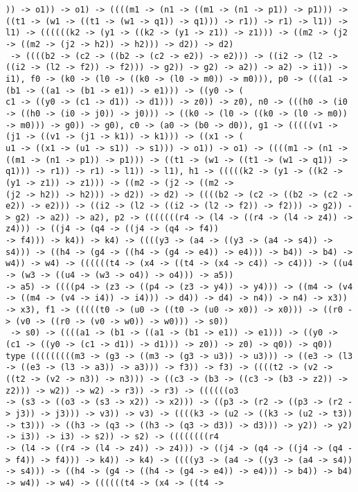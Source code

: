 \documentclass[11pt,oneside,a4paper]{report}
\begin{document}
\begin{lstlisting}[breaklines=true,caption={The output of an exponential type},label=lst:appedix:bigexp]
)) -> o1)) -> o1) -> ((((m1 -> (n1 -> ((m1 -> (n1 -> p1)) -> p1))) -> ((t1 -> (w1 -> ((t1 -> (w1 -> q1)) -> q1))) -> r1)) -> r1) -> l1)) -> l1) -> ((((((k2 -> (y1 -> ((k2 -> (y1 -> z1)) -> z1))) -> ((m2 -> (j2 -> ((m2 -> (j2 -> h2)) -> h2))) -> d2)) -> d2)
 -> ((((b2 -> (c2 -> ((b2 -> (c2 -> e2)) -> e2))) -> ((i2 -> (l2 -> ((i2 -> (l2 -> f2)) -> f2))) -> g2)) -> g2) -> a2)) -> a2) -> i1)) -> i1), f0 -> (k0 -> (l0 -> ((k0 -> (l0 -> m0)) -> m0))), p0 -> (((a1 -> (b1 -> ((a1 -> (b1 -> e1)) -> e1))) -> ((y0 -> (
c1 -> ((y0 -> (c1 -> d1)) -> d1))) -> z0)) -> z0), n0 -> (((h0 -> (i0 -> ((h0 -> (i0 -> j0)) -> j0))) -> ((k0 -> (l0 -> ((k0 -> (l0 -> m0)) -> m0))) -> g0)) -> g0), c0 -> (a0 -> (b0 -> d0)), g1 -> (((((v1 -> (j1 -> ((v1 -> (j1 -> k1)) -> k1))) -> ((x1 -> (
u1 -> ((x1 -> (u1 -> s1)) -> s1))) -> o1)) -> o1) -> ((((m1 -> (n1 -> ((m1 -> (n1 -> p1)) -> p1))) -> ((t1 -> (w1 -> ((t1 -> (w1 -> q1)) -> q1))) -> r1)) -> r1) -> l1)) -> l1), h1 -> (((((k2 -> (y1 -> ((k2 -> (y1 -> z1)) -> z1))) -> ((m2 -> (j2 -> ((m2 ->
(j2 -> h2)) -> h2))) -> d2)) -> d2) -> ((((b2 -> (c2 -> ((b2 -> (c2 -> e2)) -> e2))) -> ((i2 -> (l2 -> ((i2 -> (l2 -> f2)) -> f2))) -> g2)) -> g2) -> a2)) -> a2), p2 -> (((((((r4 -> (l4 -> ((r4 -> (l4 -> z4)) -> z4))) -> ((j4 -> (q4 -> ((j4 -> (q4 -> f4))
-> f4))) -> k4)) -> k4) -> ((((y3 -> (a4 -> ((y3 -> (a4 -> s4)) -> s4))) -> ((h4 -> (g4 -> ((h4 -> (g4 -> e4)) -> e4))) -> b4)) -> b4) -> w4)) -> w4) -> ((((((t4 -> (x4 -> ((t4 -> (x4 -> c4)) -> c4))) -> ((u4 -> (w3 -> ((u4 -> (w3 -> o4)) -> o4))) -> a5))
-> a5) -> ((((p4 -> (z3 -> ((p4 -> (z3 -> y4)) -> y4))) -> ((m4 -> (v4 -> ((m4 -> (v4 -> i4)) -> i4))) -> d4)) -> d4) -> n4)) -> n4) -> x3)) -> x3), f1 -> (((((t0 -> (u0 -> ((t0 -> (u0 -> x0)) -> x0))) -> ((r0 -> (v0 -> ((r0 -> (v0 -> w0)) -> w0))) -> s0))
 -> s0) -> ((((a1 -> (b1 -> ((a1 -> (b1 -> e1)) -> e1))) -> ((y0 -> (c1 -> ((y0 -> (c1 -> d1)) -> d1))) -> z0)) -> z0) -> q0)) -> q0))
type (((((((((m3 -> (g3 -> ((m3 -> (g3 -> u3)) -> u3))) -> ((e3 -> (l3 -> ((e3 -> (l3 -> a3)) -> a3))) -> f3)) -> f3) -> ((((t2 -> (v2 -> ((t2 -> (v2 -> n3)) -> n3))) -> ((c3 -> (b3 -> ((c3 -> (b3 -> z2)) -> z2))) -> w2)) -> w2) -> r3)) -> r3) -> ((((((o3
-> (s3 -> ((o3 -> (s3 -> x2)) -> x2))) -> ((p3 -> (r2 -> ((p3 -> (r2 -> j3)) -> j3))) -> v3)) -> v3) -> ((((k3 -> (u2 -> ((k3 -> (u2 -> t3)) -> t3))) -> ((h3 -> (q3 -> ((h3 -> (q3 -> d3)) -> d3))) -> y2)) -> y2) -> i3)) -> i3) -> s2)) -> s2) -> ((((((((r4
-> (l4 -> ((r4 -> (l4 -> z4)) -> z4))) -> ((j4 -> (q4 -> ((j4 -> (q4 -> f4)) -> f4))) -> k4)) -> k4) -> ((((y3 -> (a4 -> ((y3 -> (a4 -> s4)) -> s4))) -> ((h4 -> (g4 -> ((h4 -> (g4 -> e4)) -> e4))) -> b4)) -> b4) -> w4)) -> w4) -> ((((((t4 -> (x4 -> ((t4 ->

\end{lstlisting}
\end{document}
